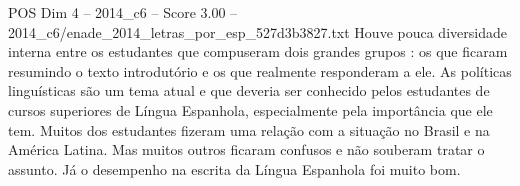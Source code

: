 \begin{textsample}{POS Dim 4 – 2014\_c6 – Score 3.00 – 2014\_c6/enade\_2014\_letras\_por\_esp\_527d3b3827.txt}
Houve pouca diversidade interna entre os estudantes que compuseram dois grandes grupos : os que ficaram resumindo o texto introdutório e os que realmente responderam a ele.
As políticas linguísticas são um tema atual e que deveria ser conhecido pelos estudantes de cursos superiores de Língua Espanhola, especialmente pela importância que ele tem.
Muitos dos estudantes fizeram uma relação com a situação no Brasil e na América Latina.
Mas muitos outros ficaram confusos e não souberam tratar o assunto.
Já o desempenho na escrita da Língua Espanhola foi muito bom.

\end{textsample}
